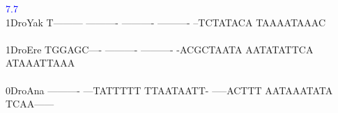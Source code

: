 \documentclass[11pt,twoside,reqno,a4paper]{article}
\begin{document}
{\hspace*{4\charwidth}\hspace*{7\charwidth}\hspace*{2\charwidth}\textcolor{Blue}{7.7}\hspace*{1\charwidth}\hspace*{1\charwidth}\hspace*{1\charwidth}\hspace*{1\charwidth}\hspace*{1\charwidth}\hspace*{1\charwidth}\\
1\hspace*{3\charwidth}DroYak	T---------	----------	----------	----------	--TCTATACA	TAAAATAAAC	\\
\hspace*{4\charwidth}\hspace*{7\charwidth}\hspace*{1\charwidth}\hspace*{1\charwidth}\hspace*{1\charwidth}\hspace*{1\charwidth}\hspace*{1\charwidth}\hspace*{1\charwidth}\\
1\hspace*{3\charwidth}DroEre	TGGAGC----	----------	----------	-ACGCTAATA	AATATATTCA	ATAAATTAAA	\\
\hspace*{4\charwidth}\hspace*{7\charwidth}\hspace*{1\charwidth}\hspace*{1\charwidth}\hspace*{1\charwidth}\hspace*{1\charwidth}\hspace*{1\charwidth}\hspace*{1\charwidth}\\
0\hspace*{3\charwidth}DroAna	----------	---TATTTTT	TTAATAATT-	-----ACTTT	AATAAATATA	TCAA------	\\
\hspace*{4\charwidth}\hspace*{7\charwidth}\hspace*{1\charwidth}\hspace*{1\charwidth}\hspace*{1\charwidth}\hspace*{1\charwidth}\hspace*{1\charwidth}\hspace*{1\charwidth}\\
}
\end{document}
